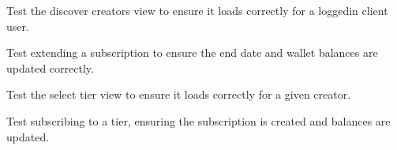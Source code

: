 \documentclass[letterpaper,10pt,english]{sphinxmanual}
\begin{document}
\begin{fulllineitems}

\begin{fulllineitems}
\label{\detokenize{modules/tests:client.tests.ClientTests.test_discover_creators}}
\pysigstartsignatures
{}
\pysigstopsignatures
\sphinxAtStartPar
Test the discover creators view to ensure it loads correctly for a logged\sphinxhyphen{}in client user.

\end{fulllineitems}


\begin{fulllineitems}
\label{\detokenize{modules/tests:client.tests.ClientTests.test_extend_subscription}}
\pysigstartsignatures
{}
\pysigstopsignatures
\sphinxAtStartPar
Test extending a subscription to ensure the end date and wallet balances are updated correctly.

\end{fulllineitems}


\begin{fulllineitems}
\label{\detokenize{modules/tests:client.tests.ClientTests.test_select_tier}}
\pysigstartsignatures
{}
\pysigstopsignatures
\sphinxAtStartPar
Test the select tier view to ensure it loads correctly for a given creator.

\end{fulllineitems}


\begin{fulllineitems}
\label{\detokenize{modules/tests:client.tests.ClientTests.test_subscribe_to_tier}}
\pysigstartsignatures
{}
\pysigstopsignatures
\sphinxAtStartPar
Test subscribing to a tier, ensuring the subscription is created and balances are updated.


\end{fulllineitems}
\end{fulllineitems}
\end{document}
